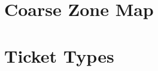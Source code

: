 \newpage

\section{Coarse Zone Map}
\label{Appendix:Coarse Zone Map}


%

\newpage








\section{Ticket Types}\label{app:tickettypes}
\footnotesize{} 
